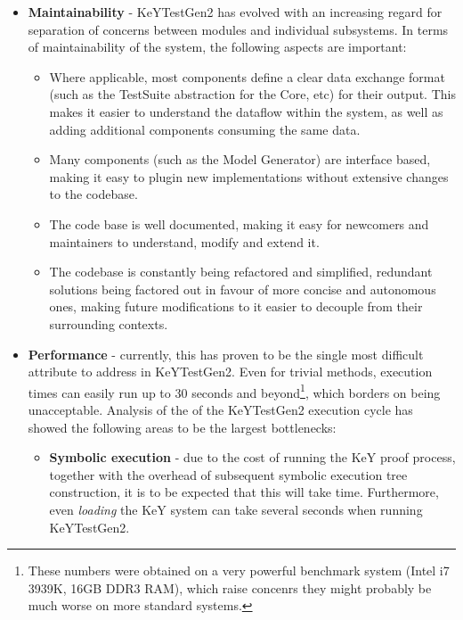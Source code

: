 \documentclass{article}
\newcommand{\tmem}[1]{{\em #1\/}}
\newcommand{\tmstrong}[1]{\textbf{#1}}
\newenvironment{itemizedot}{\begin{itemize} \renewcommand{\labelitemi}{$\bullet$}\renewcommand{\labelitemii}{$\bullet$}\renewcommand{\labelitemiii}{$\bullet$}\renewcommand{\labelitemiv}{$\bullet$}}{\end{itemize}}
\newenvironment{itemizeminus}{\begin{itemize} \renewcommand{\labelitemi}{$-$}\renewcommand{\labelitemii}{$-$}\renewcommand{\labelitemiii}{$-$}\renewcommand{\labelitemiv}{$-$}}{\end{itemize}}
\begin{document}
\begin{itemizedot}
\begin{itemizeminus}
    
  \end{itemizeminus}
  \item {\tmstrong{Maintainability}} - KeYTestGen2 has evolved with an
  increasing regard for separation of concerns between modules and individual
  subsystems. In terms of maintainability of the system, the following aspects
  are important:
  \begin{itemizeminus}
    \item Where applicable, most components define a clear data exchange
    format (such as the TestSuite abstraction for the Core, etc) for their
    output. This makes it easier to understand the dataflow within the system,
    as well as adding additional components consuming the same data.
    
    \item Many components (such as the Model Generator) are interface based,
    making it easy to plugin new implementations without extensive changes to
    the codebase.
    
    \item The code base is well documented, making it easy for newcomers and
    maintainers to understand, modify and extend it.
    
    \item The codebase is constantly being refactored and simplified,
    redundant solutions being factored out in favour of more concise and
    autonomous ones, making future modifications to it easier to decouple from
    their surrounding contexts.
    
    
  \end{itemizeminus}
  \item {\tmstrong{Performance}} - currently, this has proven to be the single
  most difficult attribute to address in KeYTestGen2. Even for trivial
  methods, execution times can easily run up to 30 seconds and
  beyond{\footnote{These numbers were obtained on a very powerful benchmark
  system (Intel i7 3939K, 16GB DDR3 RAM), which raise concenrs they might
  probably be much worse on more standard systems.}}, which borders on being
  unacceptable. Analysis of the of the KeYTestGen2 execution cycle has showed
  the following areas to be the largest bottlenecks:
  \begin{itemizeminus}
    \item {\tmstrong{Symbolic execution}} - due to the cost of running the KeY
    proof process, together with the overhead of subsequent symbolic execution
    tree construction, it is to be expected that this will take time.
    Furthermore, even {\tmem{loading}} the KeY system can take several seconds
    when running KeYTestGen2.
    

\end{itemizeminus}
\end{itemizedot}
\end{document}
